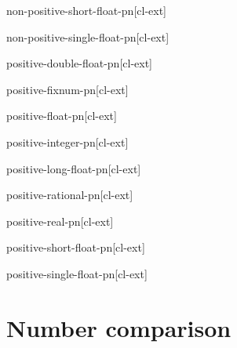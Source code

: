 \documentclass[10pt,english]{book}
\begin{document}
\begin{function}{non-positive-short-float-p}{n}[cl-ext]
  
\end{function}

\begin{function}{non-positive-single-float-p}{n}[cl-ext]
  
\end{function}

\begin{function}{positive-double-float-p}{n}[cl-ext]
  
\end{function}

\begin{function}{positive-fixnum-p}{n}[cl-ext]
  
\end{function}

\begin{function}{positive-float-p}{n}[cl-ext]
  
\end{function}

\begin{function}{positive-integer-p}{n}[cl-ext]
  
\end{function}

\begin{function}{positive-long-float-p}{n}[cl-ext]
  
\end{function}

\begin{function}{positive-rational-p}{n}[cl-ext]
  
\end{function}

\begin{function}{positive-real-p}{n}[cl-ext]
  
\end{function}

\begin{function}{positive-short-float-p}{n}[cl-ext]
  
\end{function}

\begin{function}{positive-single-float-p}{n}[cl-ext]
  
\end{function}

\section{Number comparison}
\label{sec:number-comparison}
\end{document}
